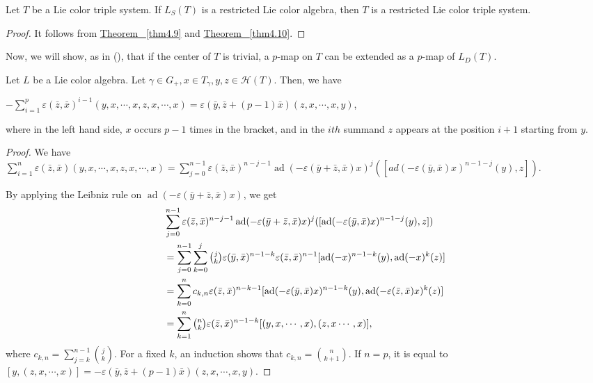 \documentclass[11pt, twoside]{article}
\DeclareMathOperator{\ad}{ad}
\begin{document}
\begin{cor}\label{c4.11}
    Let $T$ be a Lie color triple system. If $L_S(T) $ is a restricted Lie color algebra, then $T$ is a restricted Lie color triple system.
\end{cor}

\begin{proof}
    It follows from  \hyperref[thm4.9]{Theorem ~\ref*{thm4.9}} and \hyperref[thm4.10]{Theorem ~\ref*{thm4.10}}.
\end{proof}

Now, we will show, as in (\cite[Theorem $3.25 $]{H01}), that if the center of $T$ is trivial, a $p$-map on $T$ can be extended as a $p$-map of $L_D(T)$.

\begin{lem}\label{lem4.12}
    Let $L$ be a Lie color algebra. Let $\gamma\in G_+, x\in T_\gamma, y,z\in \mathcal{H}(T) $. Then, we have \begin{center}
        $-\sum\limits_{i=1}^p \varepsilon(\bar{z},\bar{x})^{i-1}(y,x,\cdots,x,z,x,\cdots,x)= \varepsilon(\bar{y},\bar{z}+(p-1)\bar{x})(z,x,\cdots,x,y) $,
    \end{center} where in the left hand side, $x$ occurs $p-1$ times in the bracket, and in the $ith$ summand $z$ appears at the position $i+1 $ starting from $y$.
\end{lem}

\begin{proof} We have \\
     $\sum\limits_{i=1}^n\varepsilon(\bar{z},\bar{x})(y,x,\cdots,x,z,x,\cdots,x)= \sum\limits_{j=0}^{n-1}\varepsilon(\bar{z},\bar{x})^{n-j-1}\ad(-\varepsilon(\bar{y}+\bar{z},\bar{x})x)^j ([ad(-\varepsilon(\bar{y},\bar{x})x)^{n-1-j}(y),z]) $.

     By applying the Leibniz rule on $\ad(-\varepsilon(\bar{y}+\bar{z},\bar{x})x) $, we get \begin{align*}
        & \sum\limits_{j=0}^{n-1}\varepsilon(\bar{z},\bar{x})^{n-j-1}\ad(-\varepsilon(\bar{y}+\bar{z},\bar{x})x)^j ([\ad(-\varepsilon(\bar{y},\bar{x})x)^{n-1-j}(y),z]) \\ & = \sum\limits_{j=0}^{n-1}\sum\limits_{k=0}^j \tbinom{j}{k}\varepsilon(\bar{y},\bar{x})^{n-1-k}\varepsilon(\bar{z},\bar{x})^{n-1}[\ad(-x)^{n-1-k}(y),\ad(-x)^k(z)] \\ & = \sum\limits_{k=0}^nc_{k,n}\varepsilon(\bar{z},\bar{x})^{n-k-1}[\ad(-\varepsilon(\bar{y},\bar{x})x)^{n-1-k}(y), \ad(-\varepsilon(\bar{z},\bar{x})x)^k(z)] \\ & = \sum\limits_{k=1}^n \tbinom{n}{k}\varepsilon(\bar{z},\bar{x})^{n-1-k}[(y,x,\cdots,x),(z,x\cdots,x)],
     \end{align*} where $c_{k,n}= \sum\limits_{j=k}^{n-1}\binom{j}{k} $. For a fixed  $k$, an induction shows that $c_{k,n}= \binom{n}{k+1} $. If $n=p$, it is equal to $[y,(z,x,\cdots,x)]= -\varepsilon(\bar{y},\bar{z}+(p-1)\bar{x})(z,x,\cdots,x,y) $.
\end{proof}
\end{document}
